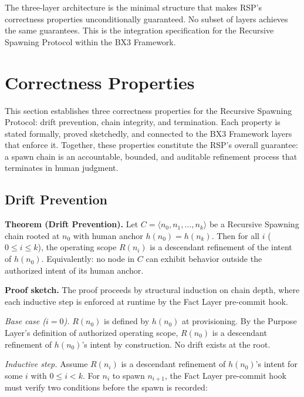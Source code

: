 The three-layer architecture is the minimal structure that makes RSP's correctness properties unconditionally guaranteed. No subset of layers achieves the same guarantees. This is the integration specification for the Recursive Spawning Protocol within the BX3 Framework.

\section{Correctness Properties}
\label{sec:rs-correctness}

This section establishes three correctness properties for the Recursive Spawning Protocol: drift prevention, chain integrity, and termination. Each property is stated formally, proved sketchedly, and connected to the BX3 Framework layers that enforce it. Together, these properties constitute the RSP's overall guarantee: a spawn chain is an accountable, bounded, and auditable refinement process that terminates in human judgment.

\subsection{Drift Prevention}
\label{sec:rs-drift-prevention}

\medskip
\noindent\textbf{Theorem (Drift Prevention).} Let $C = \langle n_0, n_1, \ldots, n_k \rangle$ be a Recursive Spawning chain rooted at $n_0$ with human anchor $h(n_0) = h(n_k)$. Then for all $i$ ($0 \leq i \leq k$), the operating scope $R(n_i)$ is a descendant refinement of the intent of $h(n_0)$. Equivalently: no node in $C$ can exhibit behavior outside the authorized intent of its human anchor.

\medskip
\noindent\textbf{Proof sketch.} The proof proceeds by structural induction on chain depth, where each inductive step is enforced at runtime by the Fact Layer pre-commit hook.

\medskip
\textit{Base case ($i=0$).} $R(n_0)$ is defined by $h(n_0)$ at provisioning. By the Purpose Layer's definition of authorized operating scope, $R(n_0)$ is a descendant refinement of $h(n_0)$'s intent by construction. No drift exists at the root.

\medskip
\textit{Inductive step.} Assume $R(n_i)$ is a descendant refinement of $h(n_0)$'s intent for some $i$ with $0 \leq i < k$. For $n_i$ to spawn $n_{i+1}$, the Fact Layer pre-commit hook must verify two conditions before the spawn is recorded:

